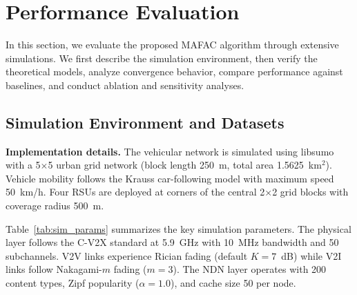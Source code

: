 \documentclass[journal]{IEEEtran}
\begin{document}
\section{Performance Evaluation} \label{sec.s}

In this section, we evaluate the proposed MAFAC algorithm through extensive simulations. We first describe the simulation environment, then verify the theoretical models, analyze convergence behavior, compare performance against baselines, and conduct ablation and sensitivity analyses.

\subsection{Simulation Environment and Datasets} \label{sec.s0}

\textbf{Implementation details.} The vehicular network is simulated using libsumo with a 5$\times$5 urban grid network (block length 250~m, total area 1.5625~km$^2$). Vehicle mobility follows the Krauss car-following model with maximum speed 50~km/h. Four RSUs are deployed at corners of the central 2$\times$2 grid blocks with coverage radius 500~m.

Table~\ref{tab:sim_params} summarizes the key simulation parameters. The physical layer follows the C-V2X standard at 5.9~GHz with 10~MHz bandwidth and 50 subchannels. V2V links experience Rician fading (default $K = 7$~dB) while V2I links follow Nakagami-$m$ fading ($m = 3$). The NDN layer operates with 200 content types, Zipf popularity ($\alpha = 1.0$), and cache size 50 per node.
\end{document}
